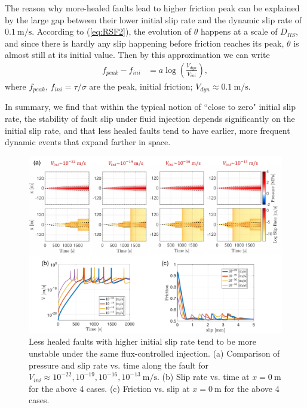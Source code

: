 The reason why more-healed faults lead to higher friction peak can be explained by the large gap between their lower initial slip rate and the dynamic slip rate of $0.1\ \mathrm{m/s}$. 
According to (\ref{eq:RSF2}), 
the evolution of $\theta$ happens at a scale of $D_{RS}$, 
and since there is hardly any slip happening before friction reaches its peak, 
$\theta$ is almost still at its initial value. 
Then by this approximation we can write 
\begin{align}
    f_{peak} - f_{ini} &= a \log\left(\frac{V_{dyn}}{V_{ini}}\right) \label{eq:deltF}, 
\end{align}
where $f_{peak}$, $f_{ini}=\tau / \sigma$ are the peak, initial friction; 
$V_{dyn}\approx 0.1\ \mathrm{m/s}$. 

In summary, 
we find that within the typical notion of ``close to zero" initial slip rate, 
the stability of fault slip under fluid injection depends significantly on the initial slip rate, 
and that less healed faults tend to have earlier, more frequent dynamic events that expand farther in space. 


\begin{figure}[htbp]
    \centering
    \includegraphics[width=1.0\textwidth]{figures/Vinitial.pdf}
    \caption{Less healed faults with higher initial slip rate tend to be more unstable under the same flux-controlled injection. (a) Comparison of pressure and slip rate vs. time along the fault for $V_{ini}\approx10^{-22}, 10^{-19}, 10^{-16}, 10^{-13}\ \mathrm{m/s}$. 
    (b) Slip rate vs. time at $x = 0\ \mathrm{m}$ for the above 4 cases. 
    (c) Friction vs. slip at $x = 0\ \mathrm{m}$ for the above 4 cases.}
    \label{fig:Vinitial}
\end{figure}

